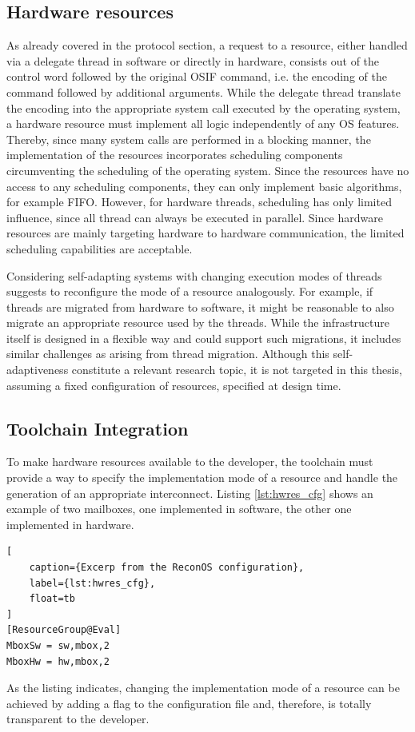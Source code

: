 \subsection{Hardware resources}
As already covered in the protocol section, a request to a resource, either
handled via a delegate thread in software or directly in hardware, consists
out of the control word followed by the original \ac{OSIF} command, i.e. the
encoding of the command followed by additional arguments. While the delegate
thread translate the encoding into the appropriate system call executed by the
operating system, a hardware resource must implement all logic independently
of any \ac{OS} features. Thereby, since many system calls are performed in a
blocking manner, the implementation of the resources incorporates scheduling
components circumventing the scheduling of the operating system. Since the
resources have no access to any scheduling components, they can only implement
basic algorithms, for example \acl{FIFO}. However, for hardware threads,
scheduling has only limited influence, since all thread can always be executed
in parallel. Since hardware resources are mainly targeting hardware to
hardware communication, the limited scheduling capabilities are acceptable.

Considering self-adapting systems with changing execution modes of threads
suggests to reconfigure the mode of a resource analogously. For example, if
threads are migrated from hardware to software, it might be reasonable to also
migrate an appropriate resource used by the threads. While the infrastructure
itself is designed in a flexible way and could support such migrations, it
includes similar challenges as arising from thread migration. Although this
self-adaptiveness constitute a relevant research topic, it is not targeted in
this thesis, assuming a fixed configuration of resources, specified at design
time.

\subsection{Toolchain Integration}
To make hardware resources available to the developer, the toolchain must
provide a way to specify the implementation mode of a resource and handle the
generation of an appropriate interconnect. Listing \ref{lst:hwres_cfg} shows
an example of two mailboxes, one implemented in software, the other one
implemented in hardware.
\begin{lstlisting}[
	caption={Excerp from the ReconOS configuration},
	label={lst:hwres_cfg},
	float=tb
]
[ResourceGroup@Eval]
MboxSw = sw,mbox,2
MboxHw = hw,mbox,2
\end{lstlisting}
As the listing indicates, changing the implementation mode of a resource can
be achieved by adding a flag to the configuration file and, therefore, is
totally transparent to the developer.

